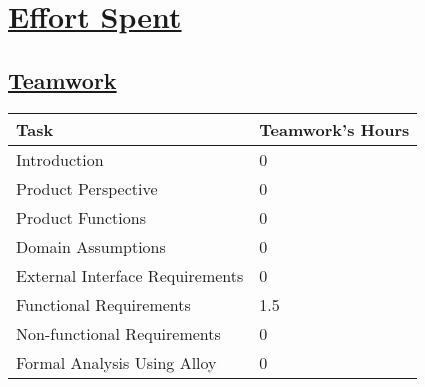 \section[Effort Spent]{\hyperlink{toc}{Effort Spent}}

\subsection[Teamwork]{\hyperlink{toc}{Teamwork}}
\vspace{2mm}
\begin{center}
	\begin{tabular}{| l | p{} |}
		\hline
		\textbf{Task} & \textbf{Teamwork's Hours} \\ \hline
		Introduction & 0 \\ \hline
		Product Perspective & 0 \\ \hline
		Product Functions & 0 \\ \hline
		Domain Assumptions & 0 \\ \hline
		External Interface Requirements & 0 \\ \hline
		Functional Requirements & 1.5 \\ \hline
		Non-functional Requirements & 0 \\ \hline
		Formal Analysis Using Alloy & 0 \\
		\hline	
	\end{tabular}
\end{center}

